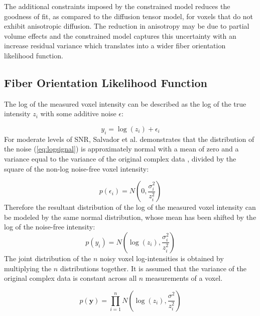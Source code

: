 The additional constraints imposed by the constrained model reduces the goodness of fit, as compared to the diffusion tensor model, for voxels that do not exhibit anisotropic diffusion.  The reduction in anisotropy may be due to partial volume effects and the constrained model captures this uncertainty with an increase residual variance which translates into a wider fiber orientation likelihood function.

\subsection{Fiber Orientation Likelihood Function}

The log of the measured voxel intensity can be described as the log of the true intensity $z_i$ with some additive noise $\epsilon$:

\begin{equation} \label{eq:logsignal}
y_i = \log(z_i) + \epsilon_i
\end{equation}
%
%
For moderate levels of SNR, Salvador et al. \cite{salvador} demonstrates that the distribution of the noise (\ref{eq:logsignal}) is approximately normal with a mean of zero and a variance equal to the variance of the original complex data \cite{salvador}, divided by the square of the non-log noise-free voxel intensity:

\begin{equation} \label{eq:noisepdf}
p(\epsilon_i) = N \left( 0, \frac{\sigma_i^2}{z_i^2} \right)
\end{equation}
%
%
Therefore the resultant distribution of the log of the measured voxel intensity can be modeled by the same normal distribution, whose mean has been shifted by the log of the noise-free intensity:
\begin{equation} \label{eq:signalpdf}
p(y_i) = N\left( \log(z_i), \frac{\sigma_i^2}{z_i^2} \right)
\end{equation}
%
%
The joint distribution of the $n$ noisy voxel log-intensities is obtained by multiplying the $n$ distributions together.  It is assumed that the variance of the original complex data is constant across all $n$ measurements of a voxel.

\begin{equation} \label{eq:jointsignalpdf}
p(\mathbf{y}) = \prod_{i=1}^{n}N\left( \log(z_i), \frac{\sigma^2}{z_i^2} \right)
\end{equation}


